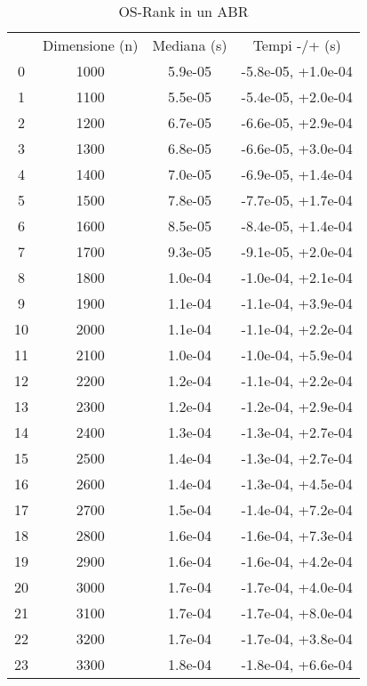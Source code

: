 \begin{table}
\centering
\caption{OS-Rank in un ABR}
\label{OS-Rank in un ABR}
\begin{adjustbox}{width=1\textwidth/2}
\begin{tabular}{|c|c|c|c|}
\hline
 & Dimensione (n) & Mediana (s) & Tempi -/+ (s) \\
0 & 1000 & 5.9e-05 & -5.8e-05, +1.0e-04 \\
\cline{1-4}
1 & 1100 & 5.5e-05 & -5.4e-05, +2.0e-04 \\
\cline{1-4}
2 & 1200 & 6.7e-05 & -6.6e-05, +2.9e-04 \\
\cline{1-4}
3 & 1300 & 6.8e-05 & -6.6e-05, +3.0e-04 \\
\cline{1-4}
4 & 1400 & 7.0e-05 & -6.9e-05, +1.4e-04 \\
\cline{1-4}
5 & 1500 & 7.8e-05 & -7.7e-05, +1.7e-04 \\
\cline{1-4}
6 & 1600 & 8.5e-05 & -8.4e-05, +1.4e-04 \\
\cline{1-4}
7 & 1700 & 9.3e-05 & -9.1e-05, +2.0e-04 \\
\cline{1-4}
8 & 1800 & 1.0e-04 & -1.0e-04, +2.1e-04 \\
\cline{1-4}
9 & 1900 & 1.1e-04 & -1.1e-04, +3.9e-04 \\
\cline{1-4}
10 & 2000 & 1.1e-04 & -1.1e-04, +2.2e-04 \\
\cline{1-4}
11 & 2100 & 1.0e-04 & -1.0e-04, +5.9e-04 \\
\cline{1-4}
12 & 2200 & 1.2e-04 & -1.1e-04, +2.2e-04 \\
\cline{1-4}
13 & 2300 & 1.2e-04 & -1.2e-04, +2.9e-04 \\
\cline{1-4}
14 & 2400 & 1.3e-04 & -1.3e-04, +2.7e-04 \\
\cline{1-4}
15 & 2500 & 1.4e-04 & -1.3e-04, +2.7e-04 \\
\cline{1-4}
16 & 2600 & 1.4e-04 & -1.3e-04, +4.5e-04 \\
\cline{1-4}
17 & 2700 & 1.5e-04 & -1.4e-04, +7.2e-04 \\
\cline{1-4}
18 & 2800 & 1.6e-04 & -1.6e-04, +7.3e-04 \\
\cline{1-4}
19 & 2900 & 1.6e-04 & -1.6e-04, +4.2e-04 \\
\cline{1-4}
20 & 3000 & 1.7e-04 & -1.7e-04, +4.0e-04 \\
\cline{1-4}
21 & 3100 & 1.7e-04 & -1.7e-04, +8.0e-04 \\
\cline{1-4}
22 & 3200 & 1.7e-04 & -1.7e-04, +3.8e-04 \\
\cline{1-4}
23 & 3300 & 1.8e-04 & -1.8e-04, +6.6e-04 \\

\end{tabular}
\end{adjustbox}
\end{table}
